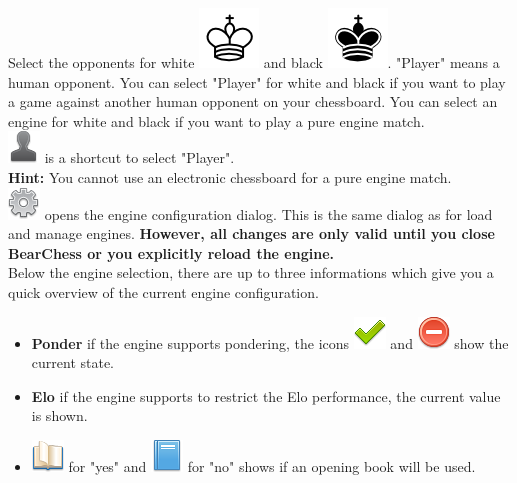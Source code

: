\documentclass[11pt,a4paper]{article}
\begin{document}
Select the opponents for white \includegraphics[scale=0.4]{KingW.png} and black \includegraphics[scale=0.4]{KingB.png}. "Player" means a human opponent. You can select "Player" for white and black if you want to play a game against another human opponent on your chessboard. You can select an engine for white and black if you want to play a pure engine match.\\
\includegraphics[scale=0.4]{user_silhouette.png} is a shortcut to select "Player".\\


\textbf{Hint:} You cannot use an electronic chessboard for a pure engine match.\\

\includegraphics[scale=0.4]{cog.png} opens the engine configuration dialog. This is the same dialog as for load and manage engines. \textbf{However, all changes are only valid until you close BearChess or you explicitly  reload the engine.}\\
Below the engine selection, there are up to three informations which give you a quick overview of the current engine configuration.

\begin{itemize}
	\item \textbf{Ponder} if the engine supports pondering, the icons \includegraphics[scale=0.4]{tick.png} and \includegraphics[scale=0.4]{delete.png} show the current state.
	\item \textbf{Elo} if the engine supports to restrict the Elo performance, the current value is shown.
	\item  \includegraphics[scale=0.4]{book_open.png} for "yes" and \includegraphics[scale=0.4]{book.png} for "no" shows if an opening book will be used.
\end{itemize}
\end{document}
